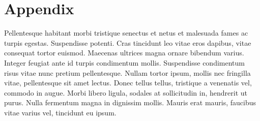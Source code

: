 \section{Appendix}\label{sec:appendix}
Pellentesque habitant morbi tristique senectus et netus et malesuada fames ac turpis egestas.
Suspendisse potenti.
Cras tincidunt leo vitae eros dapibus, vitae consequat tortor euismod.
Maecenas ultrices magna ornare bibendum varius.
Integer feugiat ante id turpis condimentum mollis.
Suspendisse condimentum risus vitae nunc pretium pellentesque.
Nullam tortor ipsum, mollis nec fringilla vitae, pellentesque sit amet lectus.
Donec tellus tellus, tristique a venenatis vel, commodo in augue.
Morbi libero ligula, sodales at sollicitudin in, hendrerit ut purus.
Nulla fermentum magna in dignissim mollis.
Mauris erat mauris, faucibus vitae varius vel, tincidunt eu ipsum.
